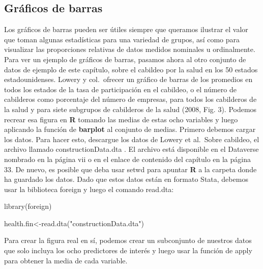 \documentclass[
]{book}
\newenvironment{Shaded}{\begin{snugshade}}{\end{snugshade}}
\newcommand{\FunctionTok}[1]{\textcolor[rgb]{0.00,0.00,0.00}{#1}}
\newcommand{\NormalTok}[1]{#1}
\newcommand{\OtherTok}[1]{\textcolor[rgb]{0.56,0.35,0.01}{#1}}
\newcommand{\StringTok}[1]{\textcolor[rgb]{0.31,0.60,0.02}{#1}}
\begin{document}
\hypertarget{gruxe1ficos-de-barras}{%
\subsection*{Gráficos de barras}\label{gruxe1ficos-de-barras}}

Los gráficos de barras pueden ser útiles siempre que queramos ilustrar el valor que toman algunas estadísticas para una variedad de grupos, así como para visualizar las proporciones relativas de datos medidos nominales u ordinalmente. Para ver un ejemplo de gráficos de barras, pasamos ahora al otro conjunto de datos de ejemplo de este capítulo, sobre el cabildeo por la salud en los 50 estados estadounidenses. Lowery y col.~ofrecer un gráfico de barras de los promedios en todos los estados de la tasa de participación en el cabildeo, o el número de cabilderos como porcentaje del número de empresas, para todos los cabilderos de la salud y para siete subgrupos de cabilderos de la salud (2008, Fig. 3). Podemos recrear esa figura en \textbf{R} tomando las medias de estas ocho variables y luego aplicando la función de \textbf{barplot} al conjunto de medias. Primero debemos cargar los datos. Para hacer esto, descargue los datos de Lowery et al.~Sobre cabildeo, el archivo llamado constructionData.dta . El archivo está disponible en el Dataverse nombrado en la página vii o en el enlace de contenido del capítulo en la página 33. De nuevo, es posible que deba usar setwd para apuntar \textbf{R} a la carpeta donde ha guardado los datos. Dado que estos datos están en formato Stata, debemos usar la biblioteca foreign y luego el comando read.dta:

\begin{Shaded}
\begin{Highlighting}[]
\FunctionTok{library}\NormalTok{(foreign)}

\NormalTok{health.fin}\OtherTok{\textless{}{-}}\FunctionTok{read.dta}\NormalTok{(}\StringTok{"constructionData.dta"}\NormalTok{)}
\end{Highlighting}
\end{Shaded}

Para crear la figura real en sí, podemos crear un subconjunto de nuestros datos que solo incluya los ocho predictores de interés y luego usar la función de apply para obtener la media de cada variable.
\end{document}
